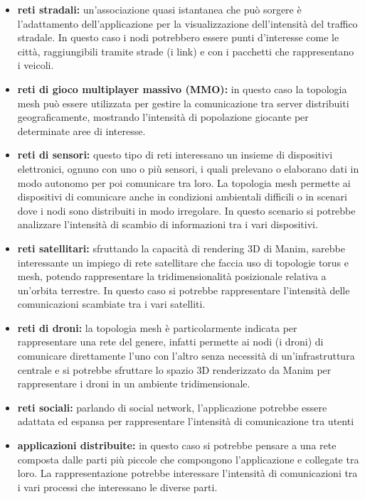 \documentclass[binding=0.6cm]{sapthesis}
\begin{document}
\begin{itemize}
    \item \textbf{reti stradali:} un'associazione quasi istantanea che può sorgere è l'adattamento dell'applicazione per la visualizzazione
    dell'intensità del traffico stradale. In questo caso i nodi potrebbero essere punti d'interesse come le città, raggiungibili tramite strade (i link) e con i pacchetti che rappresentano i veicoli.
    \item \textbf{reti di gioco multiplayer massivo (MMO):} in questo caso la topologia mesh può essere utilizzata per gestire 
    la comunicazione tra server distribuiti geograficamente, mostrando l'intensità di popolazione giocante per determinate aree di interesse.
    \item \textbf{reti di sensori:} questo tipo di reti interessano un insieme di dispositivi elettronici, ognuno con uno o più sensori, i quali prelevano o elaborano dati in modo autonomo per poi comunicare tra loro.
    La topologia mesh permette ai dispositivi di comunicare anche in condizioni ambientali difficili o in scenari dove i nodi sono 
    distribuiti in modo irregolare. In questo scenario si potrebbe analizzare l'intensità di scambio di informazioni tra i vari dispositivi.
    \item \textbf{reti satellitari:} sfruttando la capacità di rendering 3D di Manim, sarebbe interessante un impiego di rete satellitare che faccia uso di topologie torus e mesh, potendo 
    rappresentare la tridimensionalità posizionale relativa a un'orbita terrestre. In questo caso si potrebbe rappresentare l'intensità delle comunicazioni scambiate tra i vari satelliti.
    \item \textbf{reti di droni:} la topologia mesh è particolarmente indicata per rappresentare una rete del genere, infatti permette ai nodi (i droni) di comunicare direttamente l'uno con l'altro senza necessità di un'infrastruttura centrale e si potrebbe sfruttare lo spazio 3D renderizzato da Manim per rappresentare i droni in un ambiente tridimensionale.
    \item \textbf{reti sociali:} parlando di social network, l'applicazione potrebbe essere adattata ed espansa per rappresentare l'intensità di comunicazione tra utenti
    \item \textbf{applicazioni distribuite:} in questo caso si potrebbe pensare a una rete composta dalle parti più piccole che compongono l'applicazione e collegate tra loro. La rappresentazione potrebbe interessare
    l'intensità di comunicazioni tra i vari processi che interessano le diverse parti.
\end{itemize}
\end{document}
